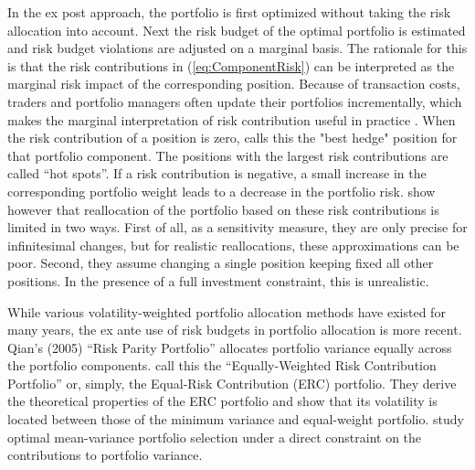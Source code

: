 \documentclass[12pt,a4paper]{article}
\begin{document}
In the ex post approach, the portfolio is first optimized without taking the risk allocation into account. Next the risk budget of the optimal portfolio is estimated and risk budget violations are adjusted on a marginal basis. The rationale for this is that the risk contributions in (\ref{eq:ComponentRisk}) can be interpreted as the marginal risk impact of the corresponding position. Because of transaction costs, traders and portfolio managers often update their portfolios incrementally, which makes the marginal interpretation of risk contribution useful in practice \citep{Litterman1996, Stoyanov2009}. When the risk contribution of a position is zero, \citet{Litterman1996} calls this the "best hedge" position for that portfolio component. The positions with the largest risk contributions are called ``hot spots''. If a risk contribution is negative, a small increase in the corresponding portfolio weight leads to a decrease in the portfolio risk.  \citet{Keel2010} show however that reallocation of the portfolio based on these risk contributions is limited in two ways. First of all, as a sensitivity measure, they are only precise for infinitesimal changes, but for realistic reallocations, these approximations can be poor. Second, they assume changing a single position keeping fixed all other positions. In the presence of a full investment constraint, this is unrealistic.


While various volatility-weighted portfolio allocation methods have existed for many years, the ex ante use of risk budgets in portfolio allocation is more recent. \nocite{Qian2005} Qian's (2005) ``Risk Parity Portfolio'' allocates portfolio variance equally across the portfolio components. \citet{Maillard2010} call this the ``Equally-Weighted Risk Contribution Portfolio'' or, simply, the Equal-Risk Contribution (ERC) portfolio. They derive the theoretical properties of the ERC portfolio and show that its volatility is located between those of the minimum variance and equal-weight portfolio. \citet{Zhu2010} study optimal mean-variance portfolio selection under a direct constraint on the contributions to portfolio variance.
\end{document}
